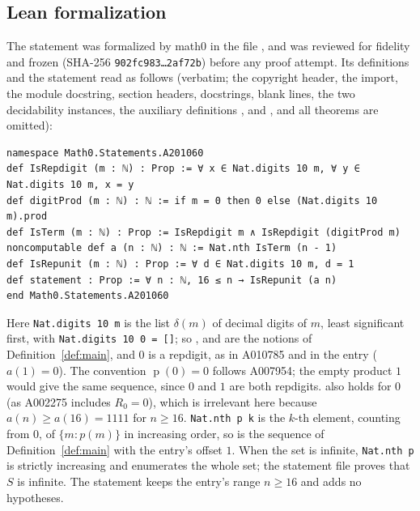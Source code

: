 \documentclass[11pt]{amsart}
\theoremstyle{plain}
\theoremstyle{definition}
\newcommand{\dprod}{\operatorname{p}}
\begin{document}
\subsection*{Lean formalization}
The statement was formalized by math0 in the file , and was reviewed for fidelity and frozen (SHA-256 \texttt{902fc983\ldots 2af72b}) before any proof attempt. Its definitions and the statement read as follows (verbatim; the copyright header, the import, the module docstring, section headers, docstrings, blank lines, the two decidability instances, the auxiliary definitions ,  and , and all theorems are omitted):
\begin{lstlisting}
namespace Math0.Statements.A201060
def IsRepdigit (m : ℕ) : Prop := ∀ x ∈ Nat.digits 10 m, ∀ y ∈ Nat.digits 10 m, x = y
def digitProd (m : ℕ) : ℕ := if m = 0 then 0 else (Nat.digits 10 m).prod
def IsTerm (m : ℕ) : Prop := IsRepdigit m ∧ IsRepdigit (digitProd m)
noncomputable def a (n : ℕ) : ℕ := Nat.nth IsTerm (n - 1)
def IsRepunit (m : ℕ) : Prop := ∀ d ∈ Nat.digits 10 m, d = 1
def statement : Prop := ∀ n : ℕ, 16 ≤ n → IsRepunit (a n)
end Math0.Statements.A201060
\end{lstlisting}
Here \texttt{Nat.digits 10 m} is the list $\delta(m)$ of decimal digits of $m$, least significant first, with \texttt{Nat.digits 10 0 = []}; so ,  and  are the notions of Definition~\ref{def:main}, and $0$ is a repdigit, as in A010785 and in the entry ($a(1)=0$). The convention $\dprod(0)=0$ follows A007954; the empty product $1$ would give the same sequence, since $0$ and $1$ are both repdigits.  also holds for $0$ (as A002275 includes $R_0=0$), which is irrelevant here because $a(n)\ge a(16)=1111$ for $n\ge16$.
\texttt{Nat.nth p k} is the $k$-th element, counting from $0$, of $\{m: p(m)\}$ in increasing order, so  is the sequence of Definition~\ref{def:main} with the entry's offset $1$. When the set is infinite, \texttt{Nat.nth p} is strictly increasing and enumerates the whole set; the statement file proves that $S$ is infinite. The statement keeps the entry's range $n\ge16$ and adds no hypotheses.
\end{document}
